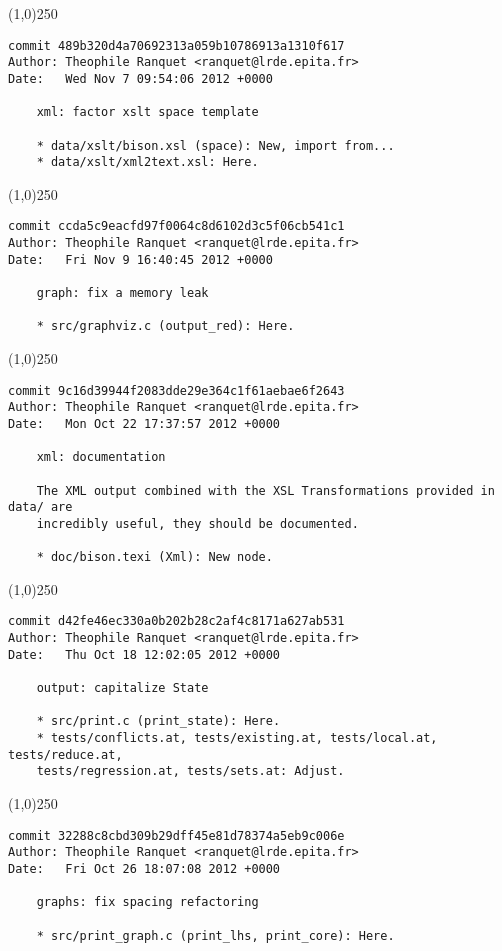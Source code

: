 \line(1,0){250}
\begin{verbatim}
commit 489b320d4a70692313a059b10786913a1310f617
Author: Theophile Ranquet <ranquet@lrde.epita.fr>
Date:   Wed Nov 7 09:54:06 2012 +0000

    xml: factor xslt space template
    
    * data/xslt/bison.xsl (space): New, import from...
    * data/xslt/xml2text.xsl: Here.

\end{verbatim}
\line(1,0){250}
\begin{verbatim}
commit ccda5c9eacfd97f0064c8d6102d3c5f06cb541c1
Author: Theophile Ranquet <ranquet@lrde.epita.fr>
Date:   Fri Nov 9 16:40:45 2012 +0000

    graph: fix a memory leak
    
    * src/graphviz.c (output_red): Here.

\end{verbatim}
\line(1,0){250}
\begin{verbatim}
commit 9c16d39944f2083dde29e364c1f61aebae6f2643
Author: Theophile Ranquet <ranquet@lrde.epita.fr>
Date:   Mon Oct 22 17:37:57 2012 +0000

    xml: documentation
    
    The XML output combined with the XSL Transformations provided in data/ are
    incredibly useful, they should be documented.
    
    * doc/bison.texi (Xml): New node.

\end{verbatim}
\line(1,0){250}
\begin{verbatim}
commit d42fe46ec330a0b202b28c2af4c8171a627ab531
Author: Theophile Ranquet <ranquet@lrde.epita.fr>
Date:   Thu Oct 18 12:02:05 2012 +0000

    output: capitalize State
    
    * src/print.c (print_state): Here.
    * tests/conflicts.at, tests/existing.at, tests/local.at, tests/reduce.at,
    tests/regression.at, tests/sets.at: Adjust.

\end{verbatim}
\line(1,0){250}
\begin{verbatim}
commit 32288c8cbd309b29dff45e81d78374a5eb9c006e
Author: Theophile Ranquet <ranquet@lrde.epita.fr>
Date:   Fri Oct 26 18:07:08 2012 +0000

    graphs: fix spacing refactoring
    
    * src/print_graph.c (print_lhs, print_core): Here.

\end{verbatim}
